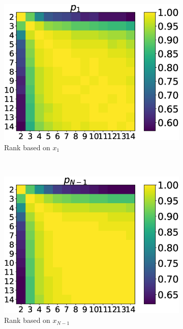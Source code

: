 \documentclass[10pt,letterpaper]{article}
\begin{document}
\begin{figure}[!htbp]
    \centering
    \begin{subfigure}[t]{.3\columnwidth}
        \centering
        \includegraphics[draft, width=\columnwidth]{./Fig6.eps}
        \caption{Rank based on \(x_1\)}
    \end{subfigure}
    ~
    \begin{subfigure}[t]{.3\columnwidth}
        \centering
        \includegraphics[draft, width=\columnwidth]{./Fig7.eps}
        \caption{Rank based on \(x_{N - 1}\)}
    \end{subfigure}
    ~
    \begin{subfigure}[t]{.3\columnwidth}

\end{subfigure}
\end{figure}
\end{document}
